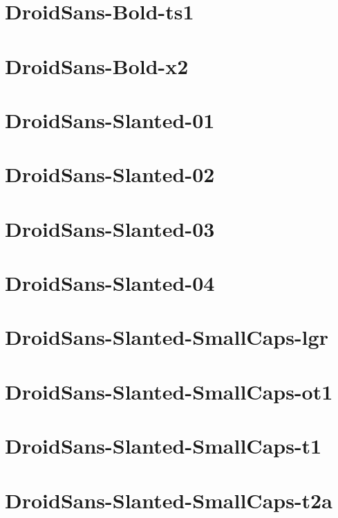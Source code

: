 \documentclass{article}
\begin{document}
\section{DroidSans-Bold-ts1}

\section{DroidSans-Bold-x2}

\section{DroidSans-Slanted-01}

\section{DroidSans-Slanted-02}

\section{DroidSans-Slanted-03}

\section{DroidSans-Slanted-04}

\section{DroidSans-Slanted-SmallCaps-lgr}

\section{DroidSans-Slanted-SmallCaps-ot1}

\section{DroidSans-Slanted-SmallCaps-t1}

\section{DroidSans-Slanted-SmallCaps-t2a}
\end{document}
